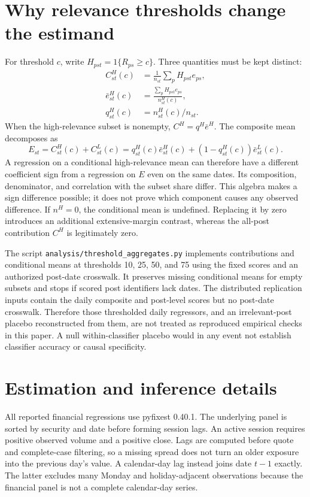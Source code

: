 \documentclass[11pt,a4paper]{article}
\begin{document}
\section{Why relevance thresholds change the estimand}
For threshold $c$, write $H_{pst}=1\{R_{ps}\geq c\}$. Three quantities must be kept distinct:
\begin{align}
 C^H_{st}(c)&=\frac{1}{n_{st}}\sum_p H_{pst}e_{ps},\\
 \bar e^H_{st}(c)&=\frac{\sum_p H_{pst}e_{ps}}{n^H_{st}(c)},\\
 q^H_{st}(c)&=n^H_{st}(c)/n_{st}.
\end{align}
When the high-relevance subset is nonempty, $C^H=q^H\bar e^H$. The composite mean decomposes as
\begin{equation}
 E_{st}=C^H_{st}(c)+C^L_{st}(c)
       =q^H_{st}(c)\bar e^H_{st}(c)+(1-q^H_{st}(c))\bar e^L_{st}(c).
\end{equation}
A regression on a conditional high-relevance mean can therefore have a different coefficient sign from a regression on $E$ even on the same dates. Its composition, denominator, and correlation with the subset share differ. This algebra makes a sign difference possible; it does not prove which component causes any observed difference. If $n^H=0$, the conditional mean is undefined. Replacing it by zero introduces an additional extensive-margin contrast, whereas the all-post contribution $C^H$ is legitimately zero.

The script \texttt{analysis/threshold\_aggregates.py} implements contributions and conditional means at thresholds 10, 25, 50, and 75 using the fixed scores and an authorized post-date crosswalk. It preserves missing conditional means for empty subsets and stops if scored post identifiers lack dates. The distributed replication inputs contain the daily composite and post-level scores but no post-date crosswalk. Therefore those thresholded daily regressors, and an irrelevant-post placebo reconstructed from them, are not treated as reproduced empirical checks in this paper. A null within-classifier placebo would in any event not establish classifier accuracy or causal specificity.

\section{Estimation and inference details}
All reported financial regressions use pyfixest 0.40.1. The underlying panel is sorted by security and date before forming session lags. An active session requires positive observed volume and a positive close. Lags are computed before quote and complete-case filtering, so a missing spread does not turn an older exposure into the previous day's value. A calendar-day lag instead joins date $t-1$ exactly. The latter excludes many Monday and holiday-adjacent observations because the financial panel is not a complete calendar-day series.
\end{document}
